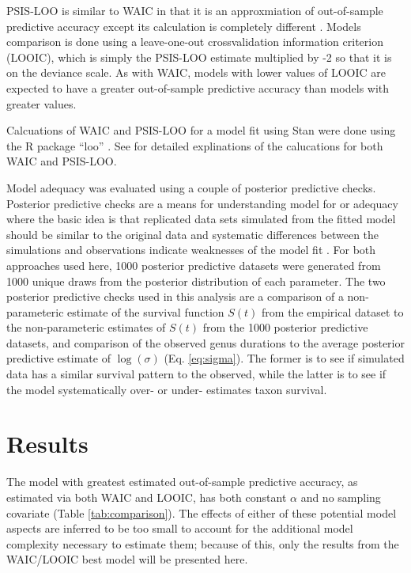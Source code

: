 \documentclass{article}
\begin{document}
PSIS-LOO is similar to WAIC in that it is an approxmiation of out-of-sample predictive accuracy except its calculation is completely different \citep{Vehtari2015,Vehtari2015a}. Models comparison is done using a leave-one-out crossvalidation information criterion (LOOIC), which is simply the PSIS-LOO estimate multiplied by -2 so that it is on the deviance scale. As with WAIC, models with lower values of LOOIC are expected to have a greater out-of-sample predictive accuracy than models with greater values.

Calcuations of WAIC and PSIS-LOO for a model fit using Stan were done using the R package ``loo'' \citep{loo}. See \citet{Vehtari2015a} for detailed explinations of the calucations for both WAIC and PSIS-LOO.

Model adequacy was evaluated using a couple of posterior predictive checks. Posterior predictive checks are a means for understanding model for or adequacy where the basic idea is that replicated data sets simulated from the fitted model should be similar to the original data and systematic differences between the simulations and observations indicate weaknesses of the model fit \citep{Gelman2013d}. For both approaches used here, 1000 posterior predictive datasets were generated from 1000 unique draws from the posterior distribution of each parameter. The two posterior predictive checks used in this analysis are a comparison of a non-parameteric estimate of the survival function \(S(t)\) from the empirical dataset to the non-parameteric estimates of \(S(t)\) from the 1000 posterior predictive datasets, and comparison of the observed genus durations to the average posterior predictive estimate of \(\log(\sigma)\) (Eq. \ref{eq:sigma}). The former is to see if simulated data has a similar survival pattern to the observed, while the latter is to see if the model systematically over- or under- estimates taxon survival.



\section{Results}

The model with greatest estimated out-of-sample predictive accuracy, as estimated via both WAIC and LOOIC, has both constant \(\alpha\) and no sampling covariate (Table \ref{tab:comparison}). The effects of either of these potential model aspects are inferred to be too small to account for the additional model complexity necessary to estimate them; because of this, only the results from the WAIC/LOOIC best model will be presented here. 
\end{document}
